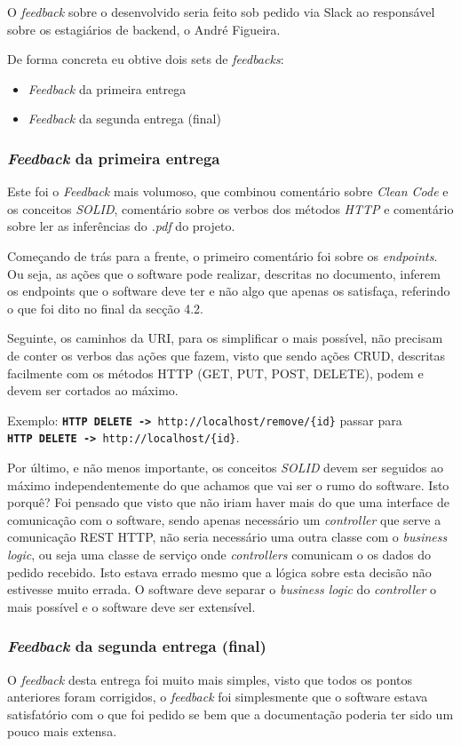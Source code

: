 O \textit{feedback} sobre o desenvolvido seria feito sob pedido via Slack ao responsável sobre os estagiários de backend, o André Figueira.

De forma concreta eu obtive dois sets de \textit{feedbacks}:

\begin{itemize}
  \item \textit{Feedback} da primeira entrega
  \item \textit{Feedback} da segunda entrega (final)
\end{itemize}

\subsubsection{\textit{Feedback} da primeira entrega}

Este foi o \textit{Feedback} mais volumoso, que combinou comentário sobre \textit{Clean Code} e os conceitos \textit{SOLID}, comentário sobre os verbos dos métodos \textit{HTTP} e comentário sobre ler as inferências do \textit{.pdf} do projeto.

Começando de trás para a frente, o primeiro comentário foi sobre os \textit{endpoints}. Ou seja, as ações que o software pode realizar, descritas no documento, inferem os endpoints que o software deve ter e não algo que apenas os satisfaça, referindo o que foi dito no final da secção 4.2.

Seguinte, os caminhos da URI, para os simplificar o mais possível, não precisam de conter os verbos das ações que fazem, visto que sendo ações CRUD, descritas facilmente com os métodos HTTP (GET, PUT, POST, DELETE), podem e devem ser cortados ao máximo.

Exemplo: \texttt{\textbf{HTTP DELETE ->} http://localhost/remove/\{id\}} passar para\\\texttt{\textbf{HTTP DELETE ->} http://localhost/\{id\}}.

Por último, e não menos importante, os conceitos \textit{SOLID} devem ser seguidos ao máximo independentemente do que achamos que vai ser o rumo do software. Isto porquê? Foi pensado que visto que não iriam haver mais do que uma interface de comunicação com o software, sendo apenas necessário um \textit{controller} que serve a comunicação REST HTTP, não seria necessário uma outra classe com o \textit{business logic}, ou seja uma classe de serviço onde \textit{controllers} comunicam o os dados do pedido recebido. Isto estava errado mesmo que a lógica sobre esta decisão não estivesse muito errada. O software deve separar o \textit{business logic} do \textit{controller} o mais possível e o software deve ser extensível.

\subsubsection{\textit{Feedback} da segunda entrega (final)}

O \textit{feedback} desta entrega foi muito mais simples, visto que todos os pontos anteriores foram corrigidos, o \textit{feedback} foi simplesmente que o software estava satisfatório com o que foi pedido se bem que a documentação poderia ter sido um pouco mais extensa.
